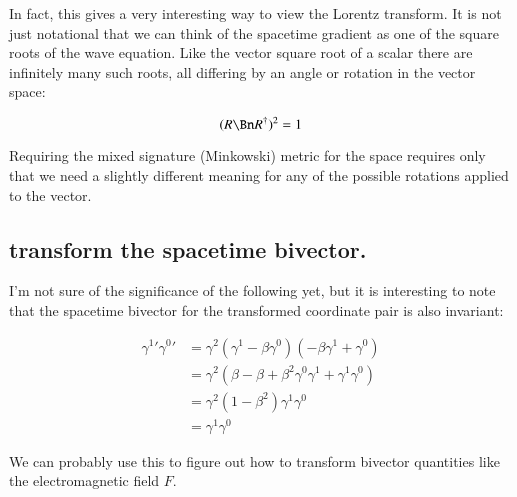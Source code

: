 In fact, this gives a very interesting way to view the Lorentz transform.  It is not just notational that we can think of the spacetime gradient as one of the square roots of the wave equation.
Like the vector square root of a scalar 
there are infinitely many such roots, all differing by an angle or rotation in the vector space:

\begin{equation*}
(R \Bn R^\dagger)^2 = 1
\end{equation*}

Requiring the mixed signature (Minkowski) metric for the space requires only that we need a slightly different meaning for any of the possible rotations
applied to the vector.

\subsection{transform the spacetime bivector. }

I'm not sure of the significance of the following yet, but it is interesting to note that the spacetime bivector for the transformed coordinate
pair is also invariant:

\begin{align*}
{\gamma^1}' {\gamma^0}'
&= \gamma^2 (\gamma^1 -\beta \gamma^0) (-\beta \gamma^1 + \gamma^0 ) \\
&= \gamma^2 (\beta -\beta +\beta^2 \gamma^0 \gamma^1 + \gamma^1 \gamma^0) \\
&= \gamma^2 (1-\beta^2) \gamma^1 \gamma^0 \\
&= \gamma^1 \gamma^0 
\end{align*}

We can probably use this to figure out how to transform bivector quantities like the electromagnetic field $F$.
